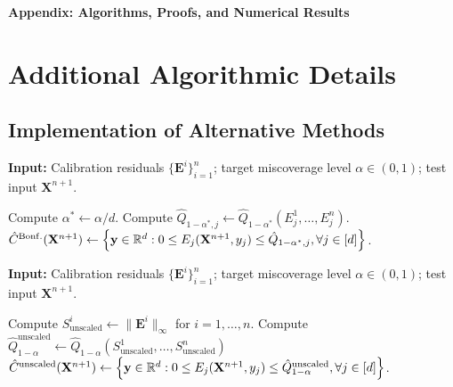 \setcounter{algorithm}{0}
\setcounter{figure}{0}
\setcounter{equation}{0}
\setcounter{theorem}{0}

\renewcommand{\thetheorem}{S\arabic{theorem}}
\renewcommand{\thelemma}{S\arabic{lemma}}
\renewcommand{\theequation}{S\arabic{equation}}
\renewcommand{\thefigure}{S\arabic{figure}}
\renewcommand{\thetable}{S\arabic{table}}
\renewcommand{\thealgorithm}{S\arabic{algorithm}}


\begin{center}
    \Large \textbf{Appendix: Algorithms, Proofs, and Numerical Results}
\end{center}

\section{Additional Algorithmic Details} \label{app:algorithms}

\subsection{Implementation of Alternative Methods}

\begin{algorithm}[!htb]
    \caption{Separate Prediction Intervals with Bonferroni Correction}
    \label{alg:bonferroni}
    \textbf{Input:} Calibration residuals $\{\mathbf{E}^i\}_{i=1}^{n}$; target miscoverage level $\alpha\in(0,1)$; test input $\mathbf{X}^{n+1}$.
    \begin{algorithmic}[1]
        \State Compute $\alpha^* \gets \alpha/d$.
        \State Compute $\hat{Q}_{1-\alpha^*,j} \gets \hat{Q}_{1-\alpha^*}(E^1_j,\ldots,E^n_j)$.
        \EndFor
        \State \Return $\hat{C}^{\mathrm{Bonf.}}(\mathbf{X}^{n+1}) \gets \left\{\mathbf y \in \mathbb{R}^d: 0 \leq E_j(\mathbf{X}^{n+1},y_j) \leq \hat{Q}_{1-\alpha^*,j}, \forall j \in [d]\right\}$.
    \end{algorithmic}
\end{algorithm}

\begin{algorithm}[!htb]
    \caption{Prediction Intervals via Dimension Reduction with $\ell_\infty$-Norm (Unscaled)}
    \label{alg:unscaled}
    \textbf{Input:} Calibration residuals $\{\mathbf{E}^i\}_{i=1}^{n}$; target miscoverage level $\alpha\in(0,1)$; test input $\mathbf{X}^{n+1}$.
    \begin{algorithmic}[1]
        \State Compute $S^i_{\mathrm{unscaled}} \gets \|\mathbf{E}^i\|_\infty$ for $i = 1,\ldots,n$.
        \State Compute $\hat{Q}^{\mathrm{unscaled}}_{1-\alpha} \gets \hat{Q}_{1-\alpha}(S^1_{\mathrm{unscaled}},\dots, S^n_{\mathrm{unscaled}})$
        \State \Return $\hat{C}^{\mathrm{unscaled}}(\mathbf{X}^{n+1}) \gets \left\{\mathbf y \in \mathbb{R}^d: 0 \leq E_j(\mathbf{X}^{n+1},y_j) \leq \hat{Q}^{\mathrm{unscaled}}_{1-\alpha}, \forall j \in [d]\right\}$.
    \end{algorithmic}
\end{algorithm}

